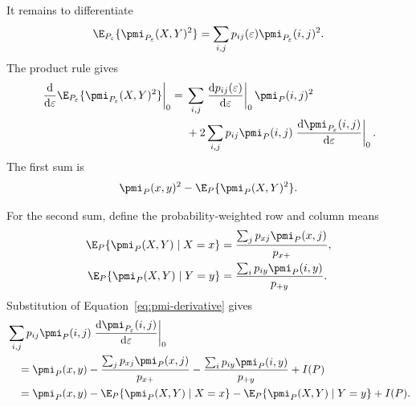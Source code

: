 It remains to differentiate
\begin{equation}
  \E_{P_\varepsilon}\{\pmi_{P_\varepsilon}(X,Y)^2\}
  =\sum_{i,j}p_{ij}(\varepsilon)
  \pmi_{P_\varepsilon}(i,j)^2.
\end{equation}
The product rule gives
\begin{align}
  \left.\frac{\mathrm d}{\mathrm d\varepsilon}
  \E_{P_\varepsilon}\{\pmi_{P_\varepsilon}(X,Y)^2\}
  \right|_{0}
  ={}&
  \sum_{i,j}
  \left.\frac{\mathrm d p_{ij}(\varepsilon)}{\mathrm d\varepsilon}
  \right|_{0}
  \pmi_P(i,j)^2
  \notag\\
  &+
  2\sum_{i,j}p_{ij}\pmi_P(i,j)
  \left.\frac{\mathrm d\pmi_{P_\varepsilon}(i,j)}
  {\mathrm d\varepsilon}\right|_{0}.
  \label{eq:m2-product-rule}
\end{align}
The first sum is
\begin{equation}
  \pmi_P(x,y)^2-\E_P\{\pmi_P(X,Y)^2\}.
  \label{eq:m2-weight-term}
\end{equation}

For the second sum, define the probability-weighted row and column means
\begin{align}
  \E_P\{\pmi_P(X,Y)\mid X=x\}
  &=\frac{\sum_j p_{xj}\pmi_P(x,j)}{p_{x+}},\\
  \E_P\{\pmi_P(X,Y)\mid Y=y\}
  &=\frac{\sum_i p_{iy}\pmi_P(i,y)}{p_{+y}}.
\end{align}
Substitution of Equation~\eqref{eq:pmi-derivative} gives
\begin{align}
  &\sum_{i,j}p_{ij}\pmi_P(i,j)
  \left.\frac{\mathrm d\pmi_{P_\varepsilon}(i,j)}
  {\mathrm d\varepsilon}\right|_{0}
  \notag\\
  &\quad=
  \pmi_P(x,y)
  -\frac{\sum_j p_{xj}\pmi_P(x,j)}{p_{x+}}
  -\frac{\sum_i p_{iy}\pmi_P(i,y)}{p_{+y}}
  +I(P)
  \notag\\
  &\quad=
  \pmi_P(x,y)
  -\E_P\{\pmi_P(X,Y)\mid X=x\}
  -\E_P\{\pmi_P(X,Y)\mid Y=y\}
  +I(P).
  \label{eq:m2-score-term}
\end{align}

